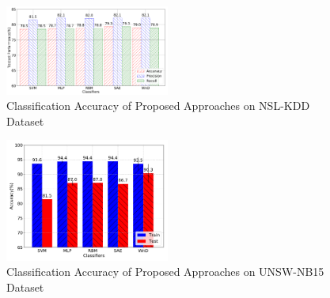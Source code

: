 \begin{figure}[h]
    \centering
    \includegraphics[width=0.48\textwidth]{figures/comp_accuracy_nsl.pdf}
    \caption{Classification Accuracy of Proposed Approaches on NSL-KDD Dataset}
    \label{Fig:CompAccuracy}
\end{figure}

\begin{figure}[h]
    \centering
    \includegraphics[width=0.48\textwidth]{figures/comp_accuracy_unsw.pdf}
    \caption{Classification Accuracy of Proposed Approaches on UNSW-NB15 Dataset}
    \label{Fig:CompAccuracyUNSW}
\end{figure}

